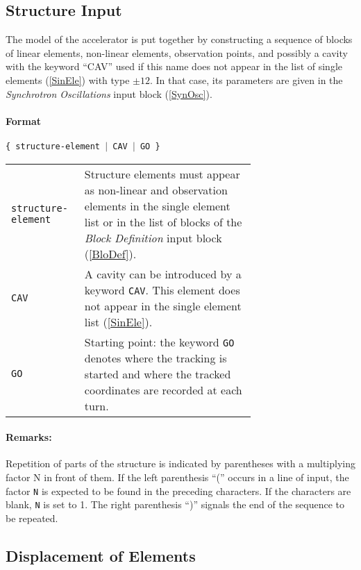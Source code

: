 \subsection{Structure Input} \label{StrInp}

The model of the accelerator is put together by constructing a sequence of blocks of linear elements, non-linear elements, observation points, and possibly a cavity with the keyword ``CAV'' used if this name does not appear in the list of single elements (\ref{SinEle}) with type $\pm 12$.
In that case, its parameters are given in the \textit{Synchrotron Oscillations} input block (\ref{SynOsc}).

\paragraph{Format} \texttt{\{ structure-element $\vert$ CAV $\vert$ GO \}}

\bigskip
\begin{tabular}{@{}lp{0.70\linewidth}}
    \texttt{structure-element} & Structure elements must appear as non-linear and observation elements in the single element list or in the list of blocks of the \textit{Block Definition} input block (\ref{BloDef}). \\
    \texttt{CAV} & A cavity can be introduced by a keyword \texttt{CAV}. This element does not appear in the single element list   (\ref{SinEle}). \\
    \texttt{GO} & Starting point: the keyword \texttt{GO} denotes where the tracking is started and where the tracked coordinates are recorded at each turn.
\end{tabular}

\paragraph{Remarks:}
Repetition of parts of the structure is indicated by parentheses with a multiplying factor N in front of them.
If the left parenthesis ``('' occurs in a line of input, the factor \texttt{N} is expected to be found in the preceding characters.
If the characters are blank, \texttt{N} is set to 1.
The right parenthesis ``)'' signals the end of the sequence to be repeated.

\subsection{Displacement of Elements} \label{DisEle}

